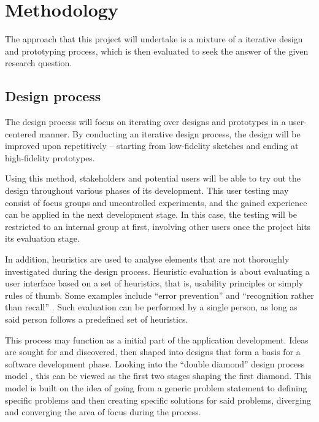 \chapter{Methodology}
\label{ch:methodology}

The approach that this project will undertake is a mixture of a iterative design and prototyping process, which is then evaluated to seek the answer of the given research question.

\section{Design process}
\label{sec:designprocess}

The design process will focus on iterating over designs and prototypes in a user-centered manner. By conducting an iterative design process, the design will be improved upon repetitively -- starting from low-fidelity sketches and ending at high-fidelity prototypes.

Using this method, stakeholders and potential users will be able to try out the design throughout various phases of its development. This user testing may consist of focus groups and uncontrolled experiments, and the gained experience can be applied in the next development stage. In this case, the testing will be restricted to an internal group at first, involving other users once the project hits its evaluation stage.

In addition, heuristics are used to analyse elements that are not thoroughly investigated during the design process. Heuristic evaluation is about evaluating a user interface based on a set of heuristics, that is, usability principles or simply rules of thumb. Some examples include \enquote{error prevention} and \enquote{recognition rather than recall} \autocite{nielsen1994}. Such evaluation can be performed by a single person, as long as said person follows a predefined set of heuristics.

This process may function as a initial part of the application development. Ideas are sought for and discovered, then shaped into designs that form a basis for a software development phase. Looking into the \enquote{double diamond} design process model \autocite{designcouncil2007}, this can be viewed as the first two stages shaping the first diamond. This model is built on the idea of going from a generic problem statement to defining specific problems and then creating specific solutions for said problems, diverging and converging the area of focus during the process.

